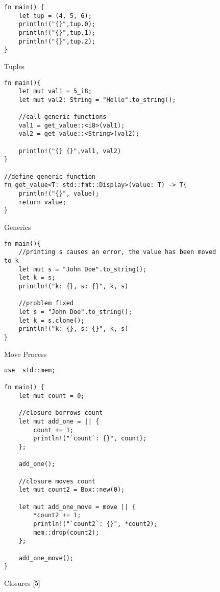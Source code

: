 \documentclass[sigconf,authorversion,nonacm]{acmart}
\begin{document}
\begin{figure} [H] 
\caption{Tuples}
    \begin{lstlisting}
fn main() {
    let tup = (4, 5, 6);
    println!("{}",tup.0);
    println!("{}",tup.1);
    println!("{}",tup.2);
}
    \end{lstlisting}
\end{figure}

\begin{figure} [H] 
\caption{Generics}
    \begin{lstlisting}
fn main(){
    let mut val1 = 5_i8;
    let mut val2: String = "Hello".to_string();

    //call generic functions
    val1 = get_value::<i8>(val1);
    val2 = get_value::<String>(val2);

    println!("{} {}",val1, val2)
}

//define generic function
fn get_value<T: std::fmt::Display>(value: T) -> T{
    println!("{}", value);
    return value;
}
    \end{lstlisting}
\end{figure}

\begin{figure} [H] 
\caption{Move Process}
    \begin{lstlisting}
fn main(){
    //printing s causes an error, the value has been moved to k
    let mut s = "John Doe".to_string();
    let k = s;
    println!("k: {}, s: {}", k, s) 

    //problem fixed
    let s = "John Doe".to_string();
    let k = s.clone();
    println!("k: {}, s: {}", k, s) 
}
    \end{lstlisting}
\end{figure}

\begin{figure} [H] 
\caption{Closures [5]}
    \begin{lstlisting}
use  std::mem;

fn main() {
    let mut count = 0;

    //closure borrows count
    let mut add_one = || {
        count += 1;
        println!("`count`: {}", count);
    };

    add_one();

    //closure moves count
    let mut count2 = Box::new(0);

    let mut add_one_move = move || {
        *count2 += 1;
        println!("`count2`: {}", *count2);
        mem::drop(count2);
    };

    add_one_move();
}
    \end{lstlisting}
\end{figure}
\end{document}
